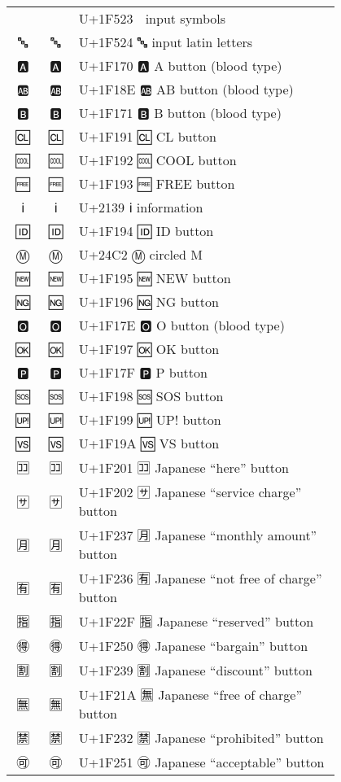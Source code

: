 \documentclass[a4paper,12pt]{ltjarticle}
\newcommand{\fontA}[1]{{\fontspec[RawFeature={mode=harf,+dist,+ccmp}]{Segoe UI Emoji} #1}}
\newcommand{\fontB}[1]{{\fontspec[RawFeature={mode=harf,+dist,+ccmp}]{Noto Color Emoji} #1}}
\begin{document}
\begin{longtable}[c]{ccp{0.8\linewidth}}
\fontA{🔣}&\fontB{🔣}&U+1F523 🔣 input symbols\\
\fontA{🔤}&\fontB{🔤}&U+1F524 🔤 input latin letters\\
\fontA{🅰}&\fontB{🅰}&U+1F170 🅰 A button (blood type)\\
\fontA{🆎}&\fontB{🆎}&U+1F18E 🆎 AB button (blood type)\\
\fontA{🅱}&\fontB{🅱}&U+1F171 🅱 B button (blood type)\\
\fontA{🆑}&\fontB{🆑}&U+1F191 🆑 CL button\\
\fontA{🆒}&\fontB{🆒}&U+1F192 🆒 COOL button\\
\fontA{🆓}&\fontB{🆓}&U+1F193 🆓 FREE button\\
\fontA{ℹ}&\fontB{ℹ}&U+2139 ℹ information\\
\fontA{🆔}&\fontB{🆔}&U+1F194 🆔 ID button\\
\fontA{Ⓜ}&\fontB{Ⓜ}&U+24C2 Ⓜ circled M\\
\fontA{🆕}&\fontB{🆕}&U+1F195 🆕 NEW button\\
\fontA{🆖}&\fontB{🆖}&U+1F196 🆖 NG button\\
\fontA{🅾}&\fontB{🅾}&U+1F17E 🅾 O button (blood type)\\
\fontA{🆗}&\fontB{🆗}&U+1F197 🆗 OK button\\
\fontA{🅿}&\fontB{🅿}&U+1F17F 🅿 P button\\
\fontA{🆘}&\fontB{🆘}&U+1F198 🆘 SOS button\\
\fontA{🆙}&\fontB{🆙}&U+1F199 🆙 UP! button\\
\fontA{🆚}&\fontB{🆚}&U+1F19A 🆚 VS button\\
\fontA{🈁}&\fontB{🈁}&U+1F201 🈁 Japanese “here” button\\
\fontA{🈂}&\fontB{🈂}&U+1F202 🈂 Japanese “service charge” button\\
\fontA{🈷}&\fontB{🈷}&U+1F237 🈷 Japanese “monthly amount” button\\
\fontA{🈶}&\fontB{🈶}&U+1F236 🈶 Japanese “not free of charge” button\\
\fontA{🈯}&\fontB{🈯}&U+1F22F 🈯 Japanese “reserved” button\\
\fontA{🉐}&\fontB{🉐}&U+1F250 🉐 Japanese “bargain” button\\
\fontA{🈹}&\fontB{🈹}&U+1F239 🈹 Japanese “discount” button\\
\fontA{🈚}&\fontB{🈚}&U+1F21A 🈚 Japanese “free of charge” button\\
\fontA{🈲}&\fontB{🈲}&U+1F232 🈲 Japanese “prohibited” button\\
\fontA{🉑}&\fontB{🉑}&U+1F251 🉑 Japanese “acceptable” button\\

\end{longtable}
\end{document}

